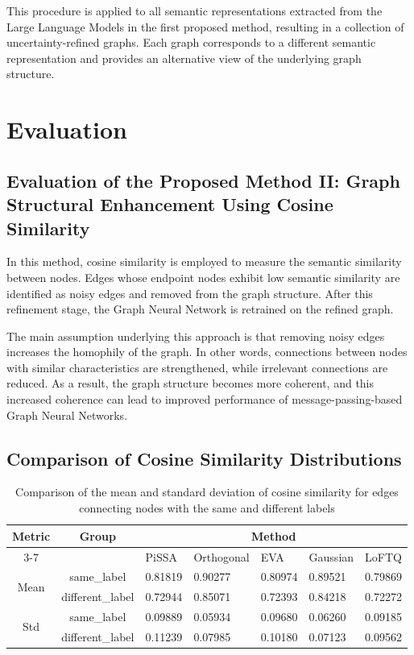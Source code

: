 \documentclass{article}
\begin{document}
This procedure is applied to all semantic representations extracted from the Large Language Models in the first proposed method, resulting in a collection of uncertainty-refined graphs. Each graph corresponds to a different semantic representation and provides an alternative view of the underlying graph structure.


\section{Evaluation}
\subsection{Evaluation of the Proposed Method II: Graph Structural Enhancement Using Cosine Similarity}

In this method, cosine similarity is employed to measure the semantic similarity between nodes. Edges whose endpoint nodes exhibit low semantic similarity are identified as noisy edges and removed from the graph structure. After this refinement stage, the Graph Neural Network is retrained on the refined graph.

The main assumption underlying this approach is that removing noisy edges increases the homophily of the graph. In other words, connections between nodes with similar characteristics are strengthened, while irrelevant connections are reduced. As a result, the graph structure becomes more coherent, and this increased coherence can lead to improved performance of message-passing-based Graph Neural Networks.

\subsection{Comparison of Cosine Similarity Distributions}

\begin{table}[ht]
\centering
\caption{Comparison of the mean and standard deviation of cosine similarity for edges connecting nodes with the same and different labels}
\begin{tabularx}{\linewidth}{c c *{5}{X}}
\hline
\multirow{2}{*}{Metric} &
\multirow{2}{*}{Group} &
\multicolumn{5}{c}{Method} \\
\cline{3-7}
&  & PiSSA & Orthogonal & EVA & Gaussian & LoFTQ \\
\hline
\multirow{2}{*}{Mean}
& same\_label
& 0.81819 & 0.90277 & 0.80974 & 0.89521 & 0.79869 \\
\cline{2-7}
& different\_label
& 0.72944 & 0.85071 & 0.72393 & 0.84218 & 0.72272 \\
\hline
\multirow{2}{*}{Std}
& same\_label
& 0.09889 & 0.05934 & 0.09680 & 0.06260 & 0.09185 \\
\cline{2-7}
& different\_label
& 0.11239 & 0.07985 & 0.10180 & 0.07123 & 0.09562 \\
\hline
\end{tabularx}
\label{tab:mean_std_cos_similarity}
\end{table}
\end{document}
